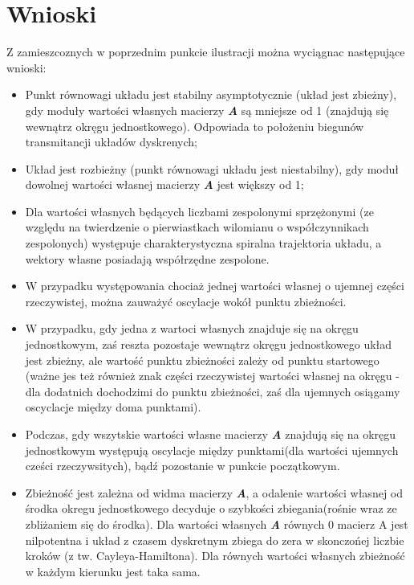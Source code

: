 \documentclass{article}
\begin{document}
\section{Wnioski}

Z zamieszcoznych w poprzednim punkcie ilustracji można wyciągnac następujące wnioski:
\begin{itemize}
\item Punkt równowagi układu jest stabilny asymptotycznie (układ jest zbieżny), gdy moduły warto\'sci własnych macierzy \textit{\textbf{A}} są mniejsze od 1 (znajdują się wewnątrz okręgu jednostkowego). Odpowiada to położeniu biegunów transmitancji układów dyskrenych;
\item Układ jest rozbieżny (punkt równowagi układu jest niestabilny), gdy moduł dowolnej warto\'sci własnej macierzy \textit{\textbf{A}} jest większy od 1;
\item Dla warto\'sci własnych będących liczbami zespolonymi sprzężonymi (ze względu na twierdzenie o pierwiastkach wilomianu o współczynnikach zespolonych) występuje charakterystyczna spiralna trajektoria układu, a wektory własne posiadają współrzędne zespolone.
\item W przypadku występowania chociaż jednej warto\'sci własnej o ujemnej czę\'sci rzeczywistej, można zauważyć oscylacje wokół punktu zbieżno\'sci.
\item W przypadku, gdy jedna z wartoci własnych znajduje się na okręgu jednostkowym, za\'s reszta pozostaje wewnątrz okręgu jednostkowego układ jest zbieżny, ale warto\'sć punktu zbieżno\'sci zależy od punktu startowego (ważne jes też również znak czę\'sci rzeczywistej warto\'sci własnej na okręgu - dla dodatnich dochodzimi do punktu zbieżno\'sci, za\'s dla ujemnych osiągamy oscyclacje między doma punktami).
\item Podczas, gdy wszytskie warto\'sci własne macierzy \textit{\textbf{A}} znajdują się na okręgu jednostkowym występują oscylacje między punktami(dla warto\'sci ujemnych cze\'sci rzeczywsitych), bądź pozostanie w punkcie początkowym.
\item Zbieżno\'sć jest zależna od widma macierzy \textit{\textbf{A}}, a odalenie warto\'sci własnej od \'srodka okregu jednostkowego decyduje o szybko\'sci zbiegania(ro\'snie wraz ze zbliżaniem się do \'srodka). Dla warto\'sci własnych \textit{\textbf{A}} równych 0 macierz A jest nilpotentna i układ z czasem dyskretnym zbiega do zera w skonczońej liczbie kroków (z tw. Cayleya-Hamiltona). Dla równych warto\'sci własnych zbieżno\'sć w każdym kierunku jest taka sama.
\end{itemize}
\end{document}
